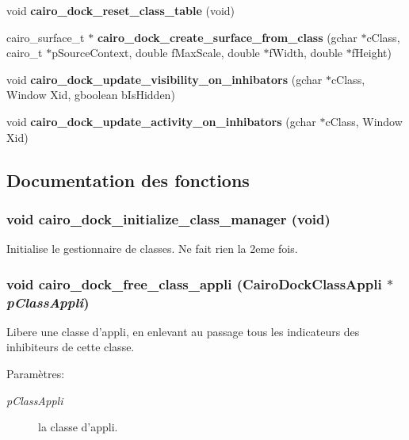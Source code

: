 \begin{CompactItemize}
\item 
void {\bf cairo\_\-dock\_\-reset\_\-class\_\-table} (void)
\item 
cairo\_\-surface\_\-t $\ast$ {\bf cairo\_\-dock\_\-create\_\-surface\_\-from\_\-class} (gchar $\ast$cClass, cairo\_\-t $\ast$pSourceContext, double fMaxScale, double $\ast$fWidth, double $\ast$fHeight)
\item 
void {\bf cairo\_\-dock\_\-update\_\-visibility\_\-on\_\-inhibators} (gchar $\ast$cClass, Window Xid, gboolean bIsHidden)
\item 
void {\bf cairo\_\-dock\_\-update\_\-activity\_\-on\_\-inhibators} (gchar $\ast$cClass, Window Xid)
\end{CompactItemize}


\subsection{Documentation des fonctions}
\subsubsection{\setlength{\rightskip}{0pt plus 5cm}void cairo\_\-dock\_\-initialize\_\-class\_\-manager (void)}\label{cairo-dock-class-manager_8h_379149f84a7b56323ab5be1389470c5c}


Initialise le gestionnaire de classes. Ne fait rien la 2eme fois. 
\subsubsection{\setlength{\rightskip}{0pt plus 5cm}void cairo\_\-dock\_\-free\_\-class\_\-appli ({\bf CairoDockClassAppli} $\ast$ {\em pClassAppli})}\label{cairo-dock-class-manager_8h_c480e21484f875cbddefbf973d04ee77}


Libere une classe d'appli, en enlevant au passage tous les indicateurs des inhibiteurs de cette classe. \begin{Desc}
\item[Paramètres:]
\begin{description}
\item[{\em pClassAppli}]la classe d'appli. \end{description}
\end{Desc}
